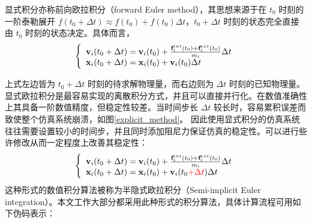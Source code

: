 显式积分亦称前向欧拉积分（forward Euler method），其思想来源于在 $t_0$ 时刻的一阶泰勒展开 $f(t_0 + \Delta t) \approx f(t_0) + \dot{f}(t_0)\Delta t$，$t_0 + \Delta t$ 时刻的状态完全直接由 $t_0$ 时刻的状态决定。具体而言，
\begin{equation}
\left\{ \begin{array}{l}
\textbf{v}_i(t_0+\Delta t) = \textbf{v}_i(t_0)+\frac{\textbf{f}_i^{int}(t_0) + \textbf{f}_i^{ext}(t_0)}{m_i}\Delta t\\
\textbf{x}_i(t_0+\Delta t) = \textbf{x}_i(t_0)+\textbf{v}_i(t_0)\Delta t
\end{array} \right.
\end{equation}

上式左边皆为 $t_0 + \Delta t$ 时刻的待求解物理量，而右边则为 $\Delta t$ 时刻的已知物理量。显式欧拉积分是最容易实现的离散积分方式，并且可以直接并行化。在数值准确性上其具备一阶数值精度，但稳定性较差。当时间步长 $\Delta t$ 较长时，容易累积误差而致使整个仿真系统崩溃，如图\ref{explicit_method}。 因此使用显式积分的仿真系统往往需要设置较小的时间步，并且同时添加阻尼力保证仿真的稳定性。可以进行些许修改从而一定程度上改善其稳定性：
\begin{equation}
\left\{ \begin{array}{l}
\textbf{v}_i(t_0+\Delta t) = \textbf{v}_i(t_0)+\frac{\textbf{f}_i^{int}(t_0) + \textbf{f}_i^{ext}(t_0)}{m_i}\Delta t\\
\textbf{x}_i(t_0+\Delta t) = \textbf{x}_i(t_0)+\textbf{v}_i(t_0 \textcolor{red}{ + \Delta t})\Delta t
\end{array} \right.
\end{equation}
这种形式的数值积分算法被称为半隐式欧拉积分（Semi-implicit Euler integration）。本文工作大部分都采用此种形式的积分算法，具体计算流程可用如下伪码表示：\\

\noindent{}\\

